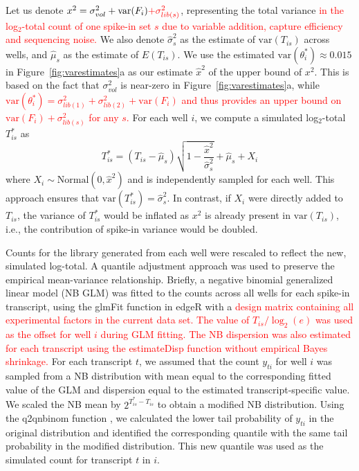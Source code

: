 \documentclass{article}
\newcommand{\revised}[1]{\textcolor{red}{#1}}
\newcommand\variance{\mbox{var}}
\begin{document}
Let us denote $x^2 = \sigma^2_{vol} + \variance(F_i) \revised{+ \sigma^2_{lib(s)}}$, representing the total variance \revised{in the log$_2$-total count of one spike-in set $s$ due to variable addition, capture efficiency and sequencing noise.}
We also denote $\hat\sigma^2_s$ as the estimate of $\variance(T_{is})$ across wells, and $\hat\mu_s$ as the estimate of $E(T_{is})$.
We use the estimated $\variance(\theta^*_i) \approx 0.015$ in Figure~\ref{fig:varestimates}a as our estimate $\hat{x}^2$ of the upper bound of $x^2$.
This is based on the fact that $\sigma^2_{vol}$ is near-zero in Figure~\ref{fig:varestimates}a, while \revised{$\variance(\theta^*_i) = \sigma^2_{lib(1)} + \sigma^2_{lib(2)} + \variance(F_i)$ and thus provides an upper bound on $\variance(F_i) + \sigma^2_{lib(s)}$ for any $s$.}
For each well $i$, we compute a simulated log$_2$-total $T^*_{is}$ as
\[
    T^*_{is} = (T_{is} - \hat\mu_s)\sqrt{1-\frac{ \hat{x}^2}{\hat\sigma^2_s}} + \hat\mu_s + X_i
\]
where $X_i \sim \mbox{Normal}(0, \hat{x}^2)$ and is independently sampled for each well.
This approach ensures that $\variance(T^*_{is}) = \hat\sigma^2_s$.
In contrast, if $X_i$ were directly added to $T_{is}$, the variance of $T^*_{is}$ would be inflated as $x^2$ is already present in $\variance(T_{is})$, i.e., the contribution of spike-in variance would be doubled.

Counts for the library generated from each well were rescaled to reflect the new, simulated log-total.
A quantile adjustment approach was used to preserve the empirical mean-variance relationship.
Briefly, a negative binomial generalized linear model (NB GLM) was fitted to the counts across all wells for each spike-in transcript, using the glmFit function in edgeR \autocite{mccarthy2012differential, robinson2010edgeR} with a \revised{design matrix containing all experimental factors in the current data set.
The value of $T_{is}/\log_2(e)$ was used as the offset for well $i$ during GLM fitting.
The NB dispersion was also estimated for each transcript using the estimateDisp function without empirical Bayes shrinkage.}
For each transcript $t$, we assumed that the count $y_{ti}$ for well $i$ was sampled from a NB distribution with mean equal to the corresponding fitted value of the GLM and dispersion equal to the estimated transcript-specific value.
We scaled the NB mean by $2^{T^*_{is} - T_{is}}$ to obtain a modified NB distribution.
Using the q2qnbinom function \autocite{robinson2008small}, we calculated the lower tail probability of $y_{ti}$ in the original distribution and identified the corresponding quantile with the same tail probability in the modified distribution.
This new quantile was used as the simulated count for transcript $t$ in $i$.
\end{document}
